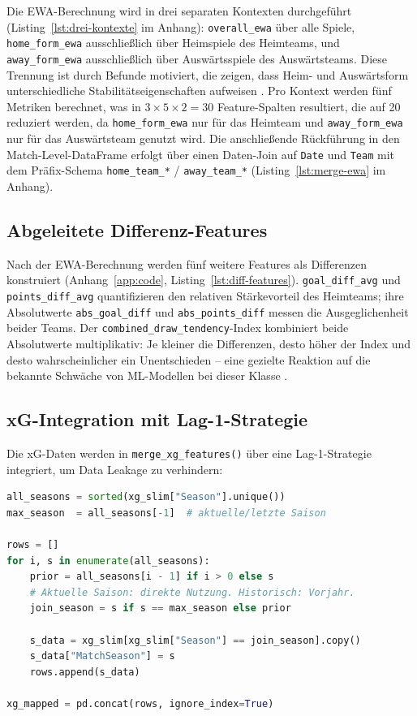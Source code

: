 Die EWA-Berechnung wird in drei separaten Kontexten durchgeführt
(Listing~\ref{lst:drei-kontexte} im Anhang):
\texttt{overall\_ewa} über alle Spiele, \texttt{home\_form\_ewa}
ausschließlich über Heimspiele des Heimteams, und \texttt{away\_form\_ewa}
ausschließlich über Auswärtsspiele des Auswärtsteams. Diese Trennung
ist durch Befunde motiviert, die zeigen, dass Heim- und Auswärtsform
unterschiedliche Stabilitätseigenschaften aufweisen \cite{DobsonGoddard2011}.
Pro Kontext werden fünf Metriken berechnet, was in $3 \times 5 \times 2 = 30$
Feature-Spalten resultiert, die auf 20 reduziert werden, da
\texttt{home\_form\_ewa} nur für das Heimteam und
\texttt{away\_form\_ewa} nur für das Auswärtsteam genutzt wird. Die
anschließende Rückführung in den Match-Level-DataFrame erfolgt über
einen Daten-Join auf \texttt{Date} und \texttt{Team} mit dem
Präfix-Schema \texttt{home\_team\_*} / \texttt{away\_team\_*}
(Listing~\ref{lst:merge-ewa} im Anhang).

\subsection{Abgeleitete Differenz-Features}

Nach der EWA-Berechnung werden fünf weitere Features als Differenzen
konstruiert (Anhang~\ref{app:code}, Listing~\ref{lst:diff-features}).
\texttt{goal\_diff\_avg} und \texttt{points\_diff\_avg} quantifizieren
den relativen Stärkevorteil des Heimteams; ihre Absolutwerte
\texttt{abs\_goal\_diff} und \texttt{abs\_points\_diff} messen die
Ausgeglichenheit beider Teams. Der \texttt{combined\_draw\_tendency}-Index
kombiniert beide Absolutwerte multiplikativ: Je kleiner die Differenzen,
desto höher der Index und desto wahrscheinlicher ein Unentschieden --
eine gezielte Reaktion auf die bekannte Schwäche von ML-Modellen bei
dieser Klasse \cite{HeGarcia2009,ChawlaEtAl2002}.

\subsection{xG-Integration mit Lag-1-Strategie}

Die xG-Daten werden in \texttt{merge\_xg\_features()} über eine
Lag-1-Strategie integriert, um Data Leakage zu verhindern:

\begin{lstlisting}[language=Python, caption={Lag-1-Strategie in \texttt{merge\_xg\_features()}},
                   label={lst:lag1}]
all_seasons = sorted(xg_slim["Season"].unique())
max_season  = all_seasons[-1]  # aktuelle/letzte Saison

rows = []
for i, s in enumerate(all_seasons):
    prior = all_seasons[i - 1] if i > 0 else s
    # Aktuelle Saison: direkte Nutzung. Historisch: Vorjahr.
    join_season = s if s == max_season else prior

    s_data = xg_slim[xg_slim["Season"] == join_season].copy()
    s_data["MatchSeason"] = s
    rows.append(s_data)

xg_mapped = pd.concat(rows, ignore_index=True)
\end{lstlisting}

